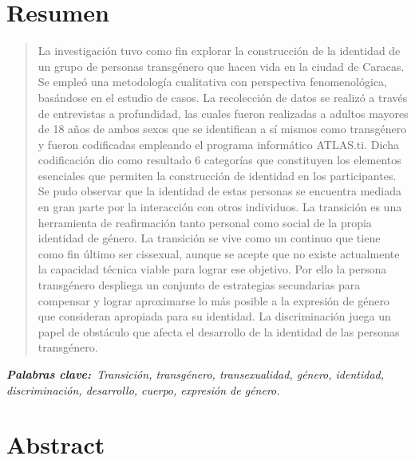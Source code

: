 \chapter{Resumen}

\begin{quote}
La investigación tuvo como fin explorar la construcción de la identidad de un
grupo de personas transgénero que hacen vida en la ciudad de Caracas. Se empleó
una metodología cualitativa con perspectiva fenomenológica, basándose en el
estudio de casos. La recolección de datos se realizó a través de entrevistas a
profundidad, las cuales fueron realizadas a adultos mayores de 18 años de ambos
sexos que se identifican a sí mismos como transgénero y fueron codificadas
empleando el programa informático ATLAS.ti\@. Dicha codificación dio como
resultado 6 categorías que constituyen los elementos esenciales que permiten la
construcción de identidad en los participantes. Se pudo observar que la
identidad de estas personas se encuentra mediada en gran parte por la
interacción con otros individuos. La transición es una herramienta de
reafirmación tanto personal como social de la propia identidad de género. La
transición se vive como un continuo que tiene como fin último ser cissexual,
aunque se acepte que no existe actualmente la capacidad técnica viable para
lograr ese objetivo. Por ello la persona transgénero despliega un conjunto de
estrategias secundarias para compensar y lograr aproximarse lo más posible a la
expresión de género que consideran apropiada para su identidad. La
discriminación juega un papel de obstáculo que afecta el desarrollo de la
identidad de las personas transgénero.
\end{quote}

\itshape\textbf{Palabras clave:}\normalfont{}\ Transición, transgénero,
transexualidad, género, identidad, discriminación, desarrollo, cuerpo,
expresión de género.

\chapter{Abstract}

\begin{center}
	\large\scshape\theengtitle\
\end{center}


